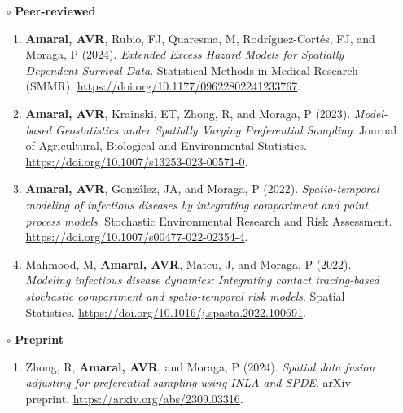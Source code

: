 \documentclass[10pt, ]{article}
\begin{document}
	\begin{itemize}[noitemsep, topsep=0pt]
		\item[$\circ$]  \textbf{Peer-reviewed}
		\begin{enumerate}[label*=\arabic*., noitemsep]
		\item  \textbf{Amaral, AVR}, Rubio, FJ, Quaresma, M, Rodríguez-Cortés, FJ, and Moraga, P (2024). \textit{Extended Excess Hazard Models for Spatially Dependent Survival Data}. Statistical Methods in Medical Research (SMMR). \href{https://doi.org/10.1177/09622802241233767}{\url{https://doi.org/10.1177/09622802241233767}}.
		\item  \textbf{Amaral, AVR}, Krainski, ET, Zhong, R, and Moraga, P (2023). \textit{Model-based Geostatistics under Spatially Varying Preferential Sampling}.  Journal of Agricultural, Biological and Environmental Statistics. \url{https://doi.org/10.1007/s13253-023-00571-0}.
		\item  \textbf{Amaral, AVR}, González, JA, and Moraga, P (2022). \textit{Spatio-temporal modeling of infectious diseases by integrating compartment and point process models}. Stochastic Environmental Research and Risk Assessment. \url{https://doi.org/10.1007/s00477-022-02354-4}.
		\item  Mahmood, M, \textbf{Amaral, AVR}, Mateu, J, and Moraga, P (2022). \textit{Modeling infectious disease dynamics: Integrating contact tracing-based stochastic compartment and spatio-temporal risk models}. Spatial Statistics. \url{https://doi.org/10.1016/j.spasta.2022.100691}.
		\end{enumerate}
		\item[$\circ$] \textbf{Preprint}
		\begin{enumerate}[label*=\arabic*., noitemsep]
			\item  Zhong, R, \textbf{Amaral, AVR}, and Moraga, P (2024).\textit{ Spatial data fusion adjusting for preferential sampling using INLA and SPDE}. arXiv preprint. \href{https://arxiv.org/abs/2309.03316}{\url{https://arxiv.org/abs/2309.03316}}.
		\end{enumerate}
	\end{itemize}
	\vspace{-2pt}
	
\end{document}
